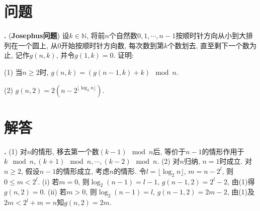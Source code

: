 \section*{问题}

\par \textbf{\theprobalg .} (\textbf{Josephus问题}) 设$k\in \mathbb{N}$, 将前$n$个自然数$0,1,\cdots,n-1$按顺时针方向从小到大排列在一个圆上, 从0开始按顺时针方向数, 每次数到第$k$个数划去, 直至剩下一个数为止, 记作$g(n,k)$, 并令$g(1,k)=0$. 证明:
\par (1) 当$n\ge 2$时, $g(n,k)=(g(n-1,k)+k) \mod n$. 
\par (2) $g(n,2)=2(n-2^{\lfloor \log_2 n\rfloor})$.


\section*{解答}
\par \textbf{\thesolalg .} (1) 对$n$的情形, 移去第一个数$(k-1)\mod n$后, 等价于$n-1$的情形作用于$k\mod n, (k+1)\mod n, \cdots, (k-2)\mod n$. (2) 对$n$归纳, $n=1$时成立. 对$n\ge 2$, 假设$n-1$的情形成立, 考虑$n$的情形. 令$l=\lfloor \log_2 n\rfloor$, $m=n-2^l$, 则$0\le m<2^l$. (i) 若$m=0$, 则$\log_2 (n-1)=l-1$, $g(n-1,2)=2^l-2$, 由(1)得$g(n,2)=0$. (ii) 若$m>0$, 则$\log_2 (n-1)=l$, $g(n-1,2)=2m-2$, 由(1)及$2m<2^l+m=n$知$g(n,2)=2m$. 